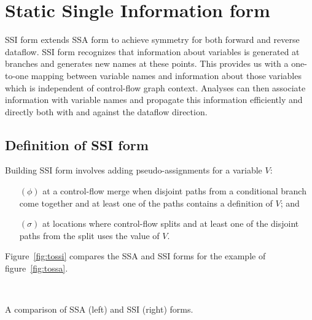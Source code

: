 \documentclass[12pt,titlepage,twoside]{article}
\let\oldsection\section
\renewcommand{\section}{\setcounter{figure}{0}\setcounter{table}{0}\oldsection}
\begin{document}
\section{Static Single Information form}\label{sec:ssi}

SSI form extends SSA form to achieve symmetry for both forward and
reverse dataflow.   SSI form recognizes that information about
variables is generated at branches and generates new names at these
points.  This provides us with a one-to-one mapping between variable
names and information about those variables which is independent of
control-flow graph context.  Analyses can then associate information
with variable names and propagate this information efficiently and
directly both with and against the dataflow direction.

\subsection{Definition of SSI form}
Building SSI form involves adding pseudo-assignments for a variable $V$:
\begin{enumerate}
\item[$(\phi)$] at a control-flow merge when disjoint paths from a
conditional branch come together and at least one of the paths
contains a definition of $V$; and
\item[$(\sigma)$] at locations where control-flow splits and at least
one of the disjoint paths from the split uses the value of $V$.
\end{enumerate}

Figure~\vref{fig:tossi} compares the SSA and SSI forms for 
the example of figure~\ref{fig:tossa}.%
\begin{myfigure}
\begin{center}
 \vline\ 
\end{center}
\caption[A comparison of SSA and SSI forms.]
{A comparison of SSA (left) and SSI (right) forms.}
\label{fig:tossi}
\end{myfigure}
\end{document}
